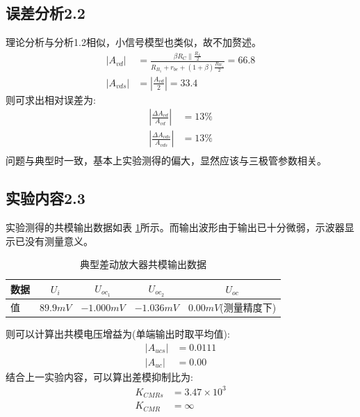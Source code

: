 \documentclass[a4paper,11pt,UTF8]{ctexart}
\begin{document}
\subsection{误差分析2.2}
理论分析与分析1.2相似，小信号模型也类似，故不加赘述。
\begin{equation}
  \begin{aligned}
    \left | A_{vd}\right |&=\frac{\beta R_C\parallel\frac{R_L}{2}}{R_{B_1}+r_{be}+(1+\beta)\frac{R_{W_1}}{2}}=66.8\\
    \left | A_{vds}\right |&=\left |\frac{A_{vd}}{2}\right |=33.4
  \end{aligned}
\end{equation}
则可求出相对误差为:
\begin{equation}
  \begin{aligned}
    \left |\frac{\Delta A_{vd}}{A_{vd}}\right |&=13\%\\
      \left |\frac{\Delta A_{vds}}{A_{vds}}\right |&=13\%\\
  \end{aligned}
\end{equation}
问题与典型时一致，基本上实验测得的偏大，显然应该与三极管参数相关。
\subsection{实验内容2.3}
实验测得的共模输出数据如表 \ref{tab:ncTab}所示。而输出波形由于输出已十分微弱，示波器显示已没有测量意义。

\begin{table}[!h!tbp]
  \caption{典型差动放大器共模输出数据}\label{tab:ncTab}
    \centering
    \begin{tabular}{|l|c|c|c|c|}
    \hline
    数据 &$U_{i}$&$U_{oc_1}$&$U_{oc_2}$&$U_{oc}$         \\ \hline
    值   &$89.9mV$&$-1.000mV$&$-1.036mV$&$0.00mV$(测量精度下)     \\ \hline
  \end{tabular}
  \end{table}
则可以计算出共模电压增益为(单端输出时取平均值):
\begin{equation}
  \begin{aligned}
    \left | A_{ucs}\right |&=0.0111\\
    \left | A_{uc}\right |&=0.00
  \end{aligned}
\end{equation}
结合上一实验内容，可以算出差模抑制比为:
\begin{equation}
  \begin{aligned}
    K_{CMRs}&=3.47\times10^3\\
    K_{CMR}&=\infty
  \end{aligned}
\end{equation}
\end{document}
